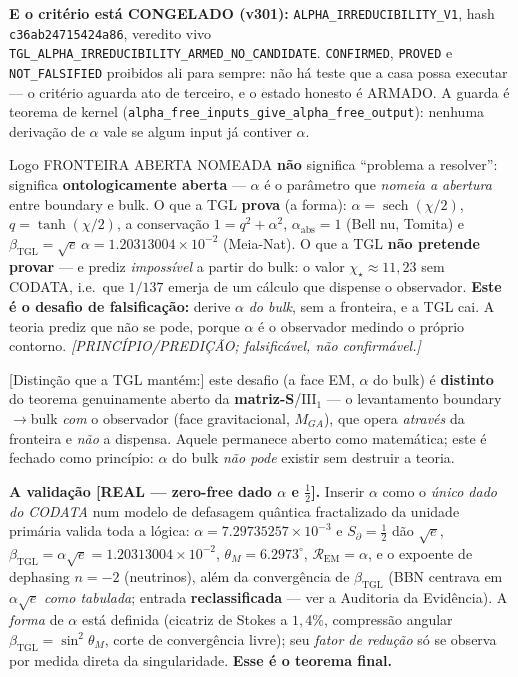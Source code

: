 \documentclass[11pt]{article}
\newcommand{\bTGL}{\beta_{\mathrm{TGL}}}\newcommand{\Msun}{M_{\odot}}\newcommand{\TGL}{\mathrm{TGL}}
\theoremstyle{definition}\newtheorem{deriv}{Derivação}
\begin{document}
\textbf{E o critério está CONGELADO (v301):} \texttt{ALPHA\_IRREDUCIBILITY\_V1}, hash \texttt{c36ab24715424a86}, veredito vivo \texttt{TGL\_ALPHA\_IRREDUCIBILITY\_ARMED\_NO\_CANDIDATE}. \texttt{CONFIRMED}, \texttt{PROVED} e \texttt{NOT\_FALSIFIED} proibidos ali para sempre: não há teste que a casa possa executar --- o critério aguarda ato de terceiro, e o estado honesto é ARMADO. A guarda é teorema de kernel (\texttt{alpha\_free\_inputs\_give\_alpha\_free\_output}): nenhuma derivação de $\alpha$ vale se algum input já contiver $\alpha$.

Logo \textsf{FRONTEIRA ABERTA NOMEADA} \textbf{não} significa ``problema a resolver'': significa \textbf{ontologicamente aberta} --- $\alpha$ é o parâmetro que \emph{nomeia a abertura} entre boundary e bulk. O que a TGL \textbf{prova} (a forma): $\alpha=\operatorname{sech}(\chi/2)$, $q=\tanh(\chi/2)$, a conservação $1=q^2+\alpha^2$, $\alpha_{\mathrm{abs}}=1$ (Bell nu, Tomita) e $\bTGL=\sqrt e\,\alpha=1.20313004\times10^{-2}$ (Meia-Nat). O que a TGL \textbf{não pretende provar} --- e prediz \emph{impossível} a partir do bulk: o valor $\chi_\star\approx11{,}23$ sem CODATA, i.e.\ que $1/137$ emerja de um cálculo que dispense o observador. \textbf{Este é o desafio de falsificação:} derive $\alpha$ \emph{do bulk}, sem a fronteira, e a TGL cai. A teoria prediz que não se pode, porque $\alpha$ é o observador medindo o próprio contorno. \emph{[PRINCÍPIO/PREDIÇÃO; falsificável, não confirmável.]}

\textsf{[Distinção que a TGL mantém:]} este desafio (a face EM, $\alpha$ do bulk) é \textbf{distinto} do teorema genuinamente aberto da \textbf{matriz-S}/$\mathrm{III}_1$ --- o levantamento boundary$\to$bulk \emph{com} o observador (face gravitacional, $M_{GA}$), que opera \emph{através} da fronteira e \emph{não} a dispensa. Aquele permanece aberto como matemática; este é fechado como princípio: $\alpha$ do bulk \emph{não pode} existir sem destruir a teoria.

\textbf{A validação \textsf{[REAL --- zero-free dado $\alpha$ e $\tfrac12$]}.} Inserir $\alpha$ como o \emph{único dado do CODATA} num modelo de defasagem quântica fractalizado da unidade primária valida toda a lógica: $\alpha=7.29735257\times10^{-3}$ e $S_\partial=\tfrac12$ dão $\sqrt e$, $\bTGL=\alpha\sqrt e=1.20313004\times10^{-2}$, $\theta_M=6.2973^\circ$, $\mathcal{R}_{\mathrm{EM}}=\alpha$, e o expoente de dephasing $n=-2$ (neutrinos), além da convergência de $\bTGL$ (BBN centrava em $\alpha\sqrt e$ \emph{como tabulada}; entrada \textbf{reclassificada} --- ver a Auditoria da Evidência). A \emph{forma} de $\alpha$ está definida (cicatriz de Stokes a $1{,}4\%$, compressão angular $\bTGL=\sin^2\theta_M$, corte de convergência livre); seu \emph{fator de redução} só se observa por medida direta da singularidade. \textbf{Esse é o teorema final.}
\end{document}
